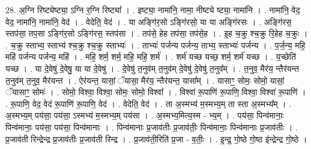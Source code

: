 \documentclass[17pt]{extarticle}
\begin{document}
28. अ॒ग्नि रिष्ट्येष्ट्या॒ ऽग्नि र॒ग्नि रिष्ट्या᳚ । . इष्ट्या॒ नामा॑नि॒ नामा॒ नीष्ट्ये ष्ट्या॒ नामा॑नि । . नामा॑नि॒ वेद॒ वेद॒ नामा॑नि॒ नामा॑नि॒ वेद॑ । . वेदेति॒ वेद॑ । . या अङ्गि॑र॒सो ऽङ्गि॑रसो॒ या या अङ्गि॑रसः । . अङ्गि॑रस॒ स्तप॑सा॒ तप॒सा ऽङ्गि॑र॒सो ऽङ्गि॑रस॒ स्तप॑सा । . तप॑से॒ हेह तप॑सा॒ तप॑से॒ह । . इ॒ह च॒क्रु श्च॒क्रु रि॒हेह च॒क्रुः । . च॒क्रु स्ताभ्य॒ स्ताभ्य॑ श्च॒क्रु श्च॒क्रु स्ताभ्यः॑ । . ताभ्यः॑ पर्जन्य पर्जन्य॒ ताभ्य॒ स्ताभ्यः॑ पर्जन्य । . प॒र्ज॒न्य॒ महि॒ महि॑ पर्जन्य पर्जन्य॒ महि॑ । . महि॒ शर्म॒ शर्म॒ महि॒ महि॒ शर्म॑ । . शर्म॑ यच्छ यच्छ॒ शर्म॒ शर्म॑ यच्छ । . य॒च्छेति॑ यच्छ । . या दे॒वेषु॑ दे॒वेषु॒ या या दे॒वेषु॑ । . दे॒वेषु॑ त॒नुव॑म् त॒नुव॑म् दे॒वेषु॑ दे॒वेषु॑ त॒नुव᳚म् । . त॒नुव॒ मैर॑य॒ न्तैर॑यन्त त॒नुव॑म् त॒नुव॒ मैर॑यन्त । . ऐर॑यन्त॒ यासां॒ ॅयासा॒ मैर॑य॒ न्तैर॑यन्त॒ यासा᳚म् । . यासाꣳ॒॒ सोमः॒ सोमो॒ यासां॒ ॅयासाꣳ॒॒ सोमः॑ । . सोमो॒ विश्वा॒ विश्वा॒ सोमः॒ सोमो॒ विश्वा᳚ । . विश्वा॑ रू॒पाणि॑ रू॒पाणि॒ विश्वा॒ विश्वा॑ रू॒पाणि॑ । . रू॒पाणि॒ वेद॒ वेद॑ रू॒पाणि॑ रू॒पाणि॒ वेद॑ । . वेदेति॒ वेद॑ । . ता अ॒स्मभ्य॑ म॒स्मभ्य॒म् ता स्ता अ॒स्मभ्य᳚म् । . अ॒स्मभ्य॒म् पय॑सा॒ पय॑सा॒ ऽस्मभ्य॑ म॒स्मभ्य॒म् पय॑सा । . अ॒स्मभ्य॒मित्य॒स्म - भ्य॒म् । . पय॑सा॒ पिन्व॑मानाः॒ पिन्व॑मानाः॒ पय॑सा॒ पय॑सा॒ पिन्व॑मानाः । . पिन्व॑मानाः प्र॒जाव॑तीः प्र॒जाव॑तीः॒ पिन्व॑मानाः॒ पिन्व॑मानाः प्र॒जाव॑तीः । . प्र॒जाव॑ती रिन्द्रेन्द्र प्र॒जाव॑तीः प्र॒जाव॑ती रिन्द्र । . प्र॒जाव॑ती॒रिति॑ प्र॒जा - व॒तीः॒ । . इ॒न्द्र॒ गो॒ष्ठे गो॒ष्ठ इ॑न्द्रेन्द्र गो॒ष्ठे । \newline
\end{document}
